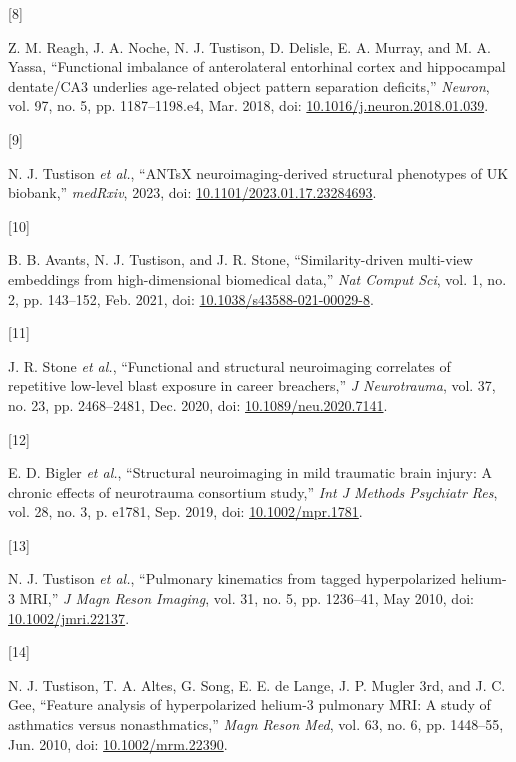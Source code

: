 \documentclass[
  11pt,
]{article}
\newlength{\cslhangindent}
\newlength{\csllabelwidth}
\newenvironment{CSLReferences}[2] %
 {%
  \setlength{\parindent}{0pt}
  \ifodd #1 \everypar{\setlength{\hangindent}{\cslhangindent}}\ignorespaces\fi
  \ifnum #2 > 0
  \setlength{\parskip}{#2\baselineskip}
  \fi
 }%
 {}
\newcommand{\CSLLeftMargin}[1]{\parbox[t]{\csllabelwidth}{#1}}
\newcommand{\CSLRightInline}[1]{\parbox[t]{\linewidth - \csllabelwidth}{#1}\break}
\begin{document}
\begin{CSLReferences}{0}{0}
\leavevmode{}%
\CSLLeftMargin{{[}8{]} }
\CSLRightInline{Z. M. Reagh, J. A. Noche, N. J. Tustison, D. Delisle, E.
A. Murray, and M. A. Yassa, {``Functional imbalance of anterolateral
entorhinal cortex and hippocampal dentate/CA3 underlies age-related
object pattern separation deficits,''} \emph{Neuron}, vol. 97, no. 5,
pp. 1187--1198.e4, Mar. 2018, doi:
\href{https://doi.org/10.1016/j.neuron.2018.01.039}{10.1016/j.neuron.2018.01.039}.}

\leavevmode{}%
\CSLLeftMargin{{[}9{]} }
\CSLRightInline{N. J. Tustison \emph{et al.}, {``ANTsX
neuroimaging-derived structural phenotypes of UK biobank,''}
\emph{medRxiv}, 2023, doi:
\href{https://doi.org/10.1101/2023.01.17.23284693}{10.1101/2023.01.17.23284693}.}

\leavevmode{}%
\CSLLeftMargin{{[}10{]} }
\CSLRightInline{B. B. Avants, N. J. Tustison, and J. R. Stone,
{``Similarity-driven multi-view embeddings from high-dimensional
biomedical data,''} \emph{Nat Comput Sci}, vol. 1, no. 2, pp. 143--152,
Feb. 2021, doi:
\href{https://doi.org/10.1038/s43588-021-00029-8}{10.1038/s43588-021-00029-8}.}

\leavevmode{}%
\CSLLeftMargin{{[}11{]} }
\CSLRightInline{J. R. Stone \emph{et al.}, {``Functional and structural
neuroimaging correlates of repetitive low-level blast exposure in career
breachers,''} \emph{J Neurotrauma}, vol. 37, no. 23, pp. 2468--2481,
Dec. 2020, doi:
\href{https://doi.org/10.1089/neu.2020.7141}{10.1089/neu.2020.7141}.}

\leavevmode{}%
\CSLLeftMargin{{[}12{]} }
\CSLRightInline{E. D. Bigler \emph{et al.}, {``Structural neuroimaging
in mild traumatic brain injury: A chronic effects of neurotrauma
consortium study,''} \emph{Int J Methods Psychiatr Res}, vol. 28, no. 3,
p. e1781, Sep. 2019, doi:
\href{https://doi.org/10.1002/mpr.1781}{10.1002/mpr.1781}.}

\leavevmode{}%
\CSLLeftMargin{{[}13{]} }
\CSLRightInline{N. J. Tustison \emph{et al.}, {``Pulmonary kinematics
from tagged hyperpolarized helium-3 MRI,''} \emph{J Magn Reson Imaging},
vol. 31, no. 5, pp. 1236--41, May 2010, doi:
\href{https://doi.org/10.1002/jmri.22137}{10.1002/jmri.22137}.}

\leavevmode{}%
\CSLLeftMargin{{[}14{]} }
\CSLRightInline{N. J. Tustison, T. A. Altes, G. Song, E. E. de Lange, J.
P. Mugler 3rd, and J. C. Gee, {``Feature analysis of hyperpolarized
helium-3 pulmonary MRI: A study of asthmatics versus nonasthmatics,''}
\emph{Magn Reson Med}, vol. 63, no. 6, pp. 1448--55, Jun. 2010, doi:
\href{https://doi.org/10.1002/mrm.22390}{10.1002/mrm.22390}.}


\end{CSLReferences}
\end{document}
